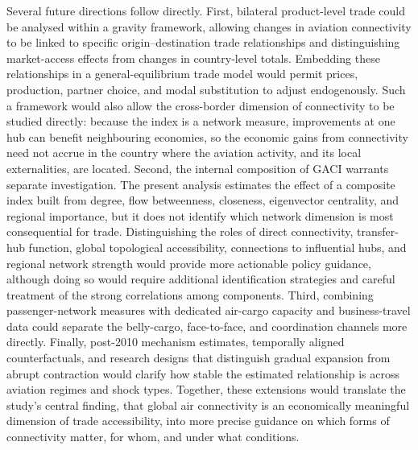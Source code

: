 Several future directions follow directly. First, bilateral product-level
trade could be analysed within a gravity framework, allowing changes in
aviation connectivity to be linked to specific origin--destination trade
relationships and distinguishing market-access effects from changes in
country-level totals. Embedding these relationships in a general-equilibrium
trade model would permit prices, production, partner choice, and modal
substitution to adjust endogenously. Such a framework would also allow the
cross-border dimension of connectivity to be studied directly: because the
index is a network measure, improvements at one hub can benefit neighbouring
economies, so the economic gains from connectivity need not accrue in the
country where the aviation activity, and its local externalities, are
located. Second, the internal composition of
GACI warrants separate investigation. The present analysis estimates the
effect of a composite index built from degree, flow betweenness, closeness,
eigenvector centrality, and regional importance, but it does not identify
which network dimension is most consequential for trade. Distinguishing the
roles of direct connectivity, transfer-hub function, global topological
accessibility, connections to influential hubs, and regional network strength
would provide more actionable policy guidance, although doing so would
require additional identification strategies and careful treatment of the
strong correlations among components. Third, combining passenger-network
measures with dedicated air-cargo capacity and business-travel data could
separate the belly-cargo, face-to-face, and coordination channels more
directly. Finally, post-2010 mechanism estimates, temporally aligned
counterfactuals, and research designs that distinguish gradual expansion from
abrupt contraction would clarify how stable the estimated relationship is
across aviation regimes and shock types. Together, these extensions would
translate the study's central finding, that global air connectivity is an
economically meaningful dimension of trade accessibility, into more precise
guidance on which forms of connectivity matter, for whom, and under what
conditions.

